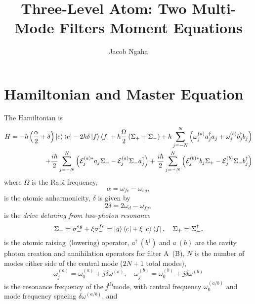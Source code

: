 \documentclass{article}
\title{Three-Level Atom: Two Multi-Mode Filters Moment Equations}
\author{Jacob Ngaha}
\newcommand{\ssth}{\textsuperscript{th}}
\begin{document}
\maketitle

\section{Hamiltonian and Master Equation}

The Hamiltonian is
\begin{equation}\label{hamiltonian}
\begin{split}
	H = -\hbar \left( \frac{\alpha}{2} + \delta \right) \ket{e}\bra{e} - 2 \hbar \delta \ket{f}\bra{f} + \hbar \frac{\Omega}{2} \left( \Sigma_{+} + \Sigma_{-} \right) + \hbar \sum_{j=-N}^{N} \left( \omega_{j}^{(a)} a^{\dagger}_{j} a_{j} + \omega_{j}^{(b)} b^{\dagger}_{j} b_{j} \right) \\
	+ \frac{i \hbar}{2} \sum_{j=-N}^{N} \left( \mathcal{E}_{j}^{(a) *} a_{j} \Sigma_{+} - \mathcal{E}_{j}^{(a)} \Sigma_{-} a^{\dagger}_{j} \right) + \frac{i \hbar}{2} \sum_{j=-N}^{N} \left( \mathcal{E}_{j}^{(b) *} b_{j} \Sigma_{+} - \mathcal{E}_{j}^{(b)} \Sigma_{-} b^{\dagger}_{j} \right)
\end{split}
\end{equation}
where $\Omega$ is the Rabi frequency,
\begin{equation}
	\alpha = \omega_{fe} - \omega_{eg},
\end{equation}
is the atomic anharmonicity, $\delta$ is given by
\begin{equation}
	2\delta = 2\omega_{d} - \omega_{fg},
\end{equation}
is the \textit{drive detuning from two-photon resonance}
\begin{equation}
	\Sigma_{-} = \sigma_{-}^{eg} + \xi \sigma_{-}^{fe} = \ket{g}\bra{e} + \xi \ket{e}\bra{f}, \quad \Sigma_{+} = \Sigma_{-}^{\dagger},
\end{equation}
is the atomic raising~(lowering) operator, $a^{\dagger}~(b^{\dagger})$ and $a~(b)$ are the cavity photon creation and annihilation operators for filter A~(B), $N$ is the number of modes either side of the central mode ($2N+1$ total modes),
\begin{equation}
	\omega_{j}^{(a)} = \omega_{0}^{(a)} + j \delta\omega^{(a)}, \quad \omega_{j}^{(b)} = \omega_{0}^{(b)} + j \delta\omega^{(b)}
\end{equation}
is the resonance frequency of the \textit{j}\ssth mode, with central frequency $\omega_{0}^{(a/b)}$ and mode frequency spacing $\delta\omega^{(a/b)}$, and
\end{document}
